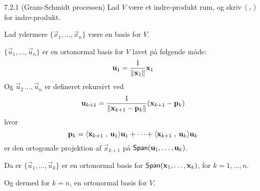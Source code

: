 \begin{saetning}{7.2.1 (Gram-Schmidt processen)}
	Lad $V$ være et indre-produkt rum, og skriv $\langle\;,\:\rangle$ for
	indre-produkt.

	\noindent
	Lad ydermere $\{\vec{x}_1, \dotsc, \vec{x}_n\}$ være en
	basis for $V$.

	\noindent
	$\{\vec{u}_1, \dotsc, \vec{u}_n\}$ er en ortonormal basis for $V$ lavet på
	følgende måde:
	\[
		\mathbf{u}_1 = \frac{1}{\lVert\mathbf{x}_1\rVert}\mathbf{x}_1
	\]
	Og $\vec{u}_2\,\dotsc,\vec{u}_n$ er defineret rekursivt ved
	\[
		\mathbf{u}_{k+1} = \frac{1}{\lVert\mathbf{x}_{k+1} - \mathbf{p}_k\rVert}(\mathbf{x}_{k+1} -\mathbf{p}_k)
	\]
	hvor
	\[
		\mathbf{p}_k = \langle\mathbf{x}_{k+1}\;,\:\mathbf{u}_1\rangle\mathbf{u}_1 + \dotsb +
		\langle\mathbf{x}_{k+1}\;,\:\mathbf{u}_k\rangle\mathbf{u}_k
	\]
	er den ortogonale projektion af $\vec{x}_{k+1}$ på $\textsf{Span}(\mathbf{u}_1,\dotsc,
	\mathbf{u}_k)$.

	\noindent
	Da er $\{\vec{u}_1, \dotsc, \vec{u}_k\}$ er en ortonormal basis for
	$\textsf{Span}(\mathbf{x}_1, \dotsc, \mathbf{x}_k)$, for $k = 1, \dotsc, n$. 
	
	\noindent
	Og dermed for $k = n$, en ortonormal basis for $V$.
\end{saetning}

